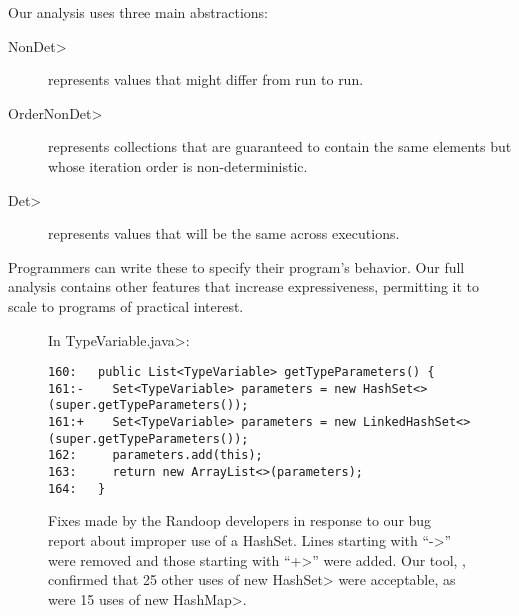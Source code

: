 Our analysis uses three main abstractions:
\begin{description}
\item[\<NonDet>] represents values that might differ from run to run.
\item[\<OrderNonDet>] represents collections that are guaranteed to contain
  the same elements but whose iteration order is non-deterministic.
\item[\<Det>] represents values that will be the same across executions.
\end{description}
\noindent
Programmers can write these to specify their program's behavior.
Our full analysis contains other features that increase
expressiveness, permitting it to scale to programs of practical interest.

\begin{figure}

\noindent
In \<TypeVariable.java>:

\begin{Verbatim}
160:   public List<TypeVariable> getTypeParameters() {
161:-    Set<TypeVariable> parameters = new HashSet<>(super.getTypeParameters());
161:+    Set<TypeVariable> parameters = new LinkedHashSet<>(super.getTypeParameters());
162:     parameters.add(this);
163:     return new ArrayList<>(parameters);
164:   }
\end{Verbatim}

\caption{Fixes made by the Randoop developers in response to our bug report
  about improper use of a HashSet.  Lines starting with ``\<->'' were
 removed and those starting with ``\<+>'' were added.
 Our tool, \theDeterminismChecker, confirmed that 
25 other uses of \<new HashSet> were acceptable, as were 15 uses of \<new HashMap>.}
\label{fig:randoop-bug-hashset}
\end{figure}



